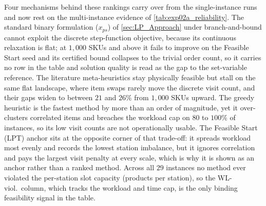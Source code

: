 \documentclass[preprint,review,11pt,authoryear]{elsarticle}
\begin{document}
Four mechanisms behind these rankings carry over from the single-instance runs and now rest on the multi-instance evidence of \cref{tab:exp02a_reliability}. The standard binary formulation ($x_{ps}$) of \cref{sec:LP_Approach} under branch-and-bound cannot exploit the discrete step-function objective, because its continuous relaxation is flat; at $1{,}000$ SKUs and above it fails to improve on the Feasible Start seed and its certified bound collapses to the trivial order count, so it carries no row in the table and solution quality is read as the gap to the set-variable reference. The literature meta-heuristics stay physically feasible but stall on the same flat landscape, where item swaps rarely move the discrete visit count, and their gaps widen to between $21$ and $26\%$ from $1{,}000$ SKUs upward. The greedy heuristic is the fastest method by more than an order of magnitude, yet it over-clusters correlated items and breaches the workload cap on $80$ to $100\%$ of instances, so its low visit counts are not operationally usable. The Feasible Start (LPT) anchor sits at the opposite corner of that trade-off: it spreads workload most evenly and records the lowest station imbalance, but it ignores correlation and pays the largest visit penalty at every scale, which is why it is shown as an anchor rather than a ranked method. Across all $29$ instances no method ever violated the per-station slot capacity (products per station), so the WL-viol.\ column, which tracks the workload and time cap, is the only binding feasibility signal in the table.
\end{document}
